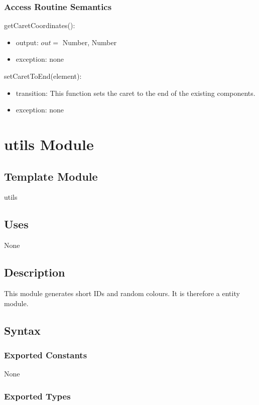 \documentclass[12pt, titlepage]{article}
\begin{document}
\subsubsection{Access Routine Semantics}

\noindent getCaretCoordinates():
\begin{itemize}
\item output: $out =$ Number, Number
\item exception: none
\end{itemize}

\noindent setCaretToEnd(element):
\begin{itemize}
\item transition: This function sets the caret to the end of the existing components.
\item exception: none
\end{itemize}

\newpage

\section{utils Module}

\subsection{Template Module}

utils

\subsection{Uses}

None

\subsection{Description}
This module generates short IDs and random colours. It is therefore a entity module.

\subsection{Syntax}

\subsubsection{Exported Constants}

None

\subsubsection{Exported Types}
\end{document}
